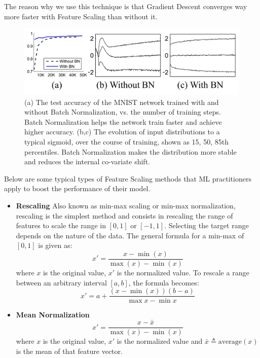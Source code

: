 \documentclass[12pt, twoside]{article}
\begin{document}
\begin{multicols*}{2}
			The reason why we use this technique is that Gradient Descent converges way more faster with Feature Scaling than without it.\cite{ioffe2015batch}
			\begin{figure}[H]
				\centering
				\includegraphics[width=\columnwidth]{BN-contrast}
				\caption{(a) The test accuracy of the MNIST network trained with and without Batch Normalization, vs. the number of training steps. Batch Normalization helps the network train faster and achieve higher accuracy. (b,c) The evolution of input distributions to a typical sigmoid, over the course of training, shown as {15, 50, 85}th percentiles. Batch Normalization makes the distribution more stable and reduces the internal co-variate shift.\cite{ioffe2015batch}}
				\label{fig:BN-contrast}
			\end{figure}
			
			Below are some typical types of Feature Scaling methods that ML practitioners apply to boost the performance of their model.
			\begin{itemize}
				\item \textbf{Rescaling} Also known as min-max scaling or min-max normalization, rescaling is the simplest method and consists in rescaling the range of features to scale the range in $[0,1]$ or $[-1,1]$. Selecting the target range depends on the nature of the data. The general formula for a min-max of $[0,1]$ is given as:
				$$ x'=\frac{x-\min(x)}{\max(x)-\min(x)} $$
				where $x$ is the original value, $x'$ is the normalized value. To rescale a range between an arbitrary interval $[a,b]$, the formula becomes:
				$$ x'=a+\frac{(x-\min(x))(b-a)}{\max{x}-\min{x}} $$
				
				\item \textbf{Mean Normalization}
				$$ x'=\frac{x-\bar{x}}{\max(x)-\min(x)} $$
				where $x$ is the original value, $ x'$ is the normalized value and $\bar{x}\triangleq\text{average}(x)$ is the mean of that feature vector.
				

\end{itemize}
\end{multicols*}
\end{document}
